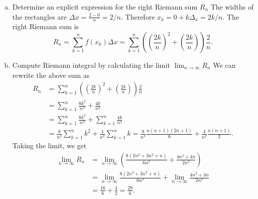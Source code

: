 \documentclass[11pt]{exam}
\theoremstyle{definition}
\begin{document}
\begin{questions}
\begin{enumerate}[(a)]
\item  Determine an explicit expression for the right Riemann sum $R_n$
The widths of the rectangles are $\Delta x = \frac{2-0}{n} = 2/n$.
Therefore $x_k = 0 + k\Delta_x = 2k/n$.
The right Riemann sum is
$$R_n = \sum_{k=1}^n f(x_k)\Delta x = \sum_{k=1}^n \left(\left(\frac{2k}{n}\right)^2+ \left(\frac{2k}{n}\right)\right)\frac{2}{n}.$$
\item  Compute Riemann integral by calculating the limit $\lim_{n\rightarrow\infty} R_n$
We can rewrite the above sum as
\begin{align*}
R_n
  &= \sum_{k=1}^n \left(\left(\frac{2k}{n}\right)^2+ \left(\frac{2k}{n}\right)\right)\frac{2}{n}\\
  &= \sum_{k=1}^n \frac{8k^2}{n^3} + \frac{4k}{n^2}\\
  &= \sum_{k=1}^n \frac{8k^2}{n^3} + \sum_{k=1}^n \frac{4k}{n^2}\\
  &= \frac{8}{n^3}\sum_{k=1}^nk^2 + \frac{4}{n^2}\sum_{k=1}^n k = \frac{8}{n^3}\frac{n(n+1)(2n+1)}{6} + \frac{4}{n^2}\frac{n(n+1)}{2}.
\end{align*}
Taking the limit, we get
\begin{align*}
\lim_{n\rightarrow\infty} R_n
  &= \lim_{n\rightarrow\infty}\left(\frac{8(2n^3+3n^2+n)}{6n^3} + \frac{4n^2+4n}{2n^2}\right)\\
  &= \lim_{n\rightarrow\infty}\frac{8(2n^3+3n^2+n)}{6n^3} + \lim_{n\rightarrow\infty}\frac{4n^2+4n}{2n^2}\\
  &= \frac{16}{6} + \frac{4}{2} = \frac{28}{6}.
\end{align*}
\end{enumerate}



\end{questions}
\end{document}
